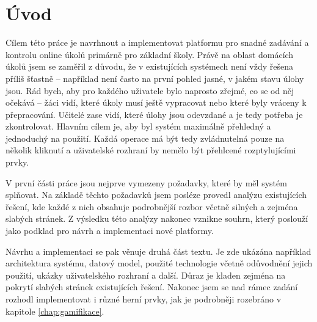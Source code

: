 \documentclass[twoside]{ctuthesis}
\theoremstyle{plain}
\theoremstyle{definition}
\theoremstyle{note}
\begin{document}
\maketitle

\chapter{Úvod}



Cílem této práce je navrhnout a implementovat platformu pro snadné zadávání a kontrolu online úkolů primárně pro základní školy. Právě na oblast domácích úkolů jsem se zaměřil z důvodu, že v existujících systémech není vždy řešena příliš šťastně -- například není často na první pohled jasné, v jakém stavu úlohy jsou. Rád bych, aby pro každého uživatele bylo naprosto zřejmé, co se od něj očekává -- žáci vidí, které úkoly musí ještě vypracovat nebo které byly vráceny k přepracování. Učitelé zase vidí, které úlohy jsou odevzdané a je tedy potřeba je zkontrolovat. Hlavním cílem je, aby byl systém maximálně přehledný a jednoduchý na použití. Každá operace má být tedy zvládnutelná pouze na několik kliknutí a uživatelské rozhraní by nemělo být přehlcené rozptylujícími prvky.

V první části práce jsou nejprve vymezeny požadavky, které by měl systém splňovat. Na základě těchto požadavků jsem posléze provedl analýzu existujících řešení, kde každé z nich obsahuje podrobnější rozbor včetně silných a zejména slabých stránek. Z výsledku této analýzy nakonec vznikne souhrn, který poslouží jako podklad pro návrh a implementaci nové platformy.

Návrhu a implementaci se pak věnuje druhá část textu. Je zde ukázána například architektura systému, datový model, použité technologie včetně odůvodnění jejich použití, ukázky uživatelského rozhraní a další. Důraz je kladen zejména na pokrytí slabých stránek existujících řešení. Nakonec jsem se nad rámec zadání rozhodl implementovat i různé herní prvky, jak je podrobněji rozebráno v kapitole \ref{chap:gamifikace}.
\end{document}
